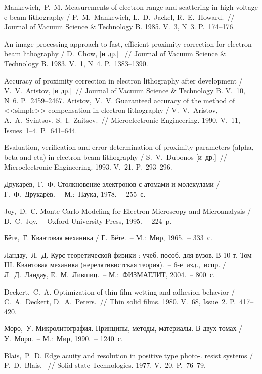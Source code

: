 \begin{thebibliography}{99}
 Mankewich,~P.~M. Measurements of electron range and scattering in
high voltage e-beam lithography / P.~M.~Mankewich, L.~D.~Jackel,
R.~E.~Howard.~// Journal of Vacuum Science \& Technology B. 1985. V.~3, N~3.
P.~174--176.

 An image processing approach to fast, efficient proximity correction for
electron beam lithography / D.~Chow, [и др.] ~// Journal of Vacuum Science \& Technology B. 1983.
V.~1, N~4. P.~1383--1390.%

 Accuracy of proximity correction in electron lithography after
development / V.~V.~Aristov, [и др.]~// Journal of Vacuum Science \& Technology B. V.~10,
N~6. P.~2459--2467.
 Aristov,~V.~V. Guaranteed accuracy of the method of <<simple>>
compensation in electron lithography / V.~V.~Aristov, A.~A.~Svintsov,
S.~I.~Zaitsev.~// Microelectronic Engineering. 1990. V.~11, Issues~1--4.
P.~641--644.

 Evaluation, verification and error determination of proximity
parameters (alpha, beta and eta) in electron beam lithography / S.~V.~Dubonos [и~др.]~// Microelectronic
Engineering. 1993. V.~21. P.~293--296.%

 Друкарёв,~Г.~Ф. Столкновение электронов с атомами и молекулами /
Г.~Ф.~Друкарёв.~-- М.:~Наука, 1978.~-- 255~с.

 Joy,~D.~C. Monte Carlo Modeling for Electron Microscopy and
Microanalysis / D.~C.~Joy.~-- Oxford University Press, 1995.~-- 224~p.

 Бёте,~Г. Квантовая механика / Г.~Бёте.~-- М.:~Мир, 1965.~-- 333~с.

 Ландау,~Л.~Д. Курс теоретической физики : учеб. пособ. для вузов.
В 10 т. Том III. Квантовая механика (нерелятивистская теория).~--
6-е~изд.,~испр. / Л.~Д.~Ландау, Е.~М.~Лившиц.~-- М.:~ФИЗМАТЛИТ, 2004.~-- 800~с.

 Deckert,~C.~A. Optimization of thin film wetting and adhesion
behavior / C.~A.~Deckert, D.~A.~Peters.~// Thin solid films. 1980. V.~68,
Issue~2. P.~417--420.

 Моро,~У. Микролитография. Принципы, методы, материалы. В двух
томах / У.~Моро.~-- М.:~Мир, 1990.~-- 1240~с.

 Blais,~P.~D. Edge acuity and resolution in positive type photo-.
resist systems / P.~D.~Blais.~ // Solid-state Technologies. 1977. V.~20.
P.~76--79.


\end{thebibliography}
